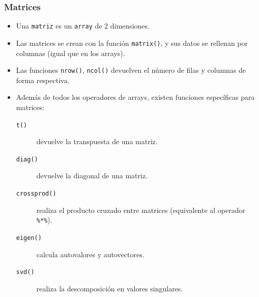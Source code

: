 \documentclass{beamer}
\begin{document}
\begin{frame}
\frametitle{Matrices}
\begin{itemize}
\item Una \texttt{matriz} es un \texttt{array} de 2 dimensiones.
\item Las matrices se crean con la función \texttt{matrix()}, y sus datos se rellenan por columnas (igual que en los arrays).
\item Las funciones \texttt{nrow()}, \texttt{ncol()} devuelven el número de filas y columnas de forma respectiva.
\item Además de todos los operadores de arrays, existen funciones específicas para matrices:
\begin{description}
\item[\texttt{t()}] devuelve la transpuesta de una matriz.
\item[\texttt{diag()}] devuelve la diagonal de una matriz.
\item[\texttt{crossprod()}] realiza el producto cruzado entre matrices (equivalente al operador \texttt{\%*\%}).
\item[\texttt{eigen()}] calcula autovalores y autovectores.
\item[\texttt{svd()}] realiza la descomposición en valores singulares.
\end{description}
\end{itemize}
\end{frame}
\end{document}
